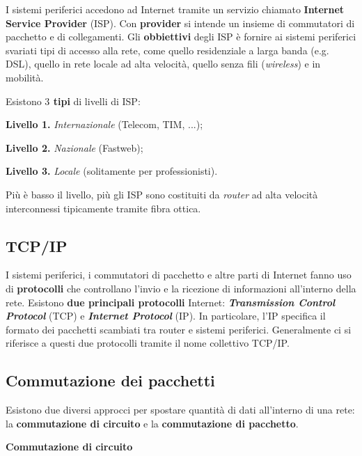 \documentclass[a4paper]{article}
\begin{document}
	I sistemi periferici accedono ad Internet tramite un servizio chiamato \textbf{Internet Service Provider} (ISP). Con \textbf{provider} si intende un insieme di commutatori di pacchetto e di collegamenti. Gli \textbf{obbiettivi} degli ISP è fornire ai sistemi periferici svariati tipi di accesso alla rete, come quello residenziale a larga banda (e.g. DSL), quello in rete locale ad alta velocità, quello senza fili (\emph{wireless}) e in mobilità.
	
	\noindent
	Esistono \textbf{$3$ tipi} di livelli di ISP:
	
	\begin{description}
		\item{\textbf{Livello 1.}} \emph{Internazionale} (Telecom, TIM, ...);
		\item{\textbf{Livello 2.}} \emph{Nazionale} (Fastweb);
		\item{\textbf{Livello 3.}} \emph{Locale} (solitamente per professionisti).
	\end{description}

	Più è basso il livello, più gli ISP sono costituiti da \emph{router} ad alta velocità interconnessi tipicamente tramite fibra ottica.
	
	\subsection{TCP/IP}
	
	I sistemi periferici, i commutatori di pacchetto e altre parti di Internet fanno uso di \textbf{protocolli} che controllano l’invio e la ricezione di informazioni all’interno della rete. Esistono \textbf{due principali protocolli} Internet: \textbf{\emph{Transmission Control Protocol}} (TCP) e \textbf{\emph{Internet Protocol}} (IP). In particolare, l’IP specifica il formato dei pacchetti scambiati tra router e sistemi periferici. Generalmente ci si riferisce a questi due protocolli tramite il nome collettivo TCP/IP.
	
	\newpage
	
	\subsection{Commutazione dei pacchetti}
	
	Esistono due diversi approcci per spostare quantità di dati all’interno di una rete: la \textbf{commutazione di circuito} e la \textbf{commutazione di pacchetto}.
	
	\begin{center}
		\large \textcolor{Red3}{\textbf{Commutazione di circuito}}
	\end{center}
	
\end{document}
